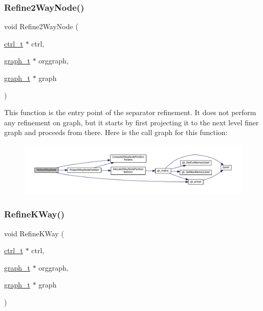 \subsubsection{\texorpdfstring{Refine2\+Way\+Node()}{Refine2WayNode()}}
{\footnotesize\ttfamily void Refine2\+Way\+Node (\begin{DoxyParamCaption}\item[{\hyperlink{a00742}{ctrl\+\_\+t} $\ast$}]{ctrl,  }\item[{\hyperlink{a00734}{graph\+\_\+t} $\ast$}]{orggraph,  }\item[{\hyperlink{a00734}{graph\+\_\+t} $\ast$}]{graph }\end{DoxyParamCaption})}

This function is the entry point of the separator refinement. It does not perform any refinement on graph, but it starts by first projecting it to the next level finer graph and proceeds from there. Here is the call graph for this function\+:\nopagebreak
\begin{figure}[H]
\begin{center}
\leavevmode
\includegraphics[width=350pt]{a00945_a2fd4bd5f789c1c1248aa326d0cac9023_cgraph}
\end{center}
\end{figure}
\mbox{\label{a00945_adeb3fad496482fea745a00c7b39ca7cf}} 
\subsubsection{\texorpdfstring{Refine\+K\+Way()}{RefineKWay()}}
{\footnotesize\ttfamily void Refine\+K\+Way (\begin{DoxyParamCaption}\item[{\hyperlink{a00742}{ctrl\+\_\+t} $\ast$}]{ctrl,  }\item[{\hyperlink{a00734}{graph\+\_\+t} $\ast$}]{orggraph,  }\item[{\hyperlink{a00734}{graph\+\_\+t} $\ast$}]{graph }\end{DoxyParamCaption})}

